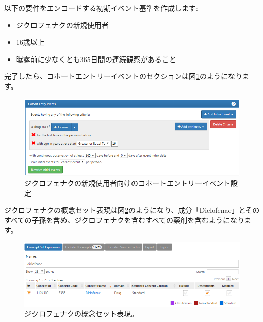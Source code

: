 \documentclass[
  11pt]{book}
\providecommand{\tightlist}{%
  \setlength{\itemsep}{0pt}\setlength{\parskip}{0pt}}
\theoremstyle{definition}
\theoremstyle{definition}
\theoremstyle{definition}
\theoremstyle{definition}
\theoremstyle{remark}
\begin{document}
以下の要件をエンコードする初期イベント基準を作成します:

\begin{itemize}
\tightlist
\item
  ジクロフェナクの新規使用者
\item
  16歳以上
\item
  曝露前に少なくとも365日間の連続観察があること
\end{itemize}

完了したら、コホートエントリーイベントのセクションは図\ref{fig:cohortsAtlasInitialEvents}のようになります。

\begin{figure}

{\centering \includegraphics[width=1\linewidth]{images/SuggestedAnswers/cohortsAtlasInitialEvents} 

}

\caption{ジクロフェナクの新規使用者向けのコホートエントリーイベント設定}\label{fig:cohortsAtlasInitialEvents}
\end{figure}

ジクロフェナクの概念セット表現は図\ref{fig:cohortsAtlasConceptSet1}のようになり、成分「Diclofenac」とそのすべての子孫を含め、ジクロフェナクを含むすべての薬剤を含むようになります。

\begin{figure}

{\centering \includegraphics[width=1\linewidth]{images/SuggestedAnswers/cohortsAtlasConceptSet1} 

}

\caption{ジクロフェナクの概念セット表現。}\label{fig:cohortsAtlasConceptSet1}
\end{figure}
\end{document}
